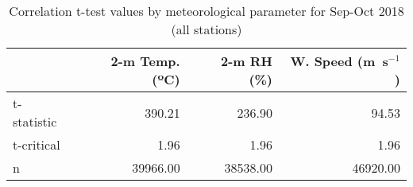 \begin{table}
\centering
\caption{Correlation t-test values by meteorological parameter for Sep-Oct 2018 (all stations)}
\label{tab: r_sign_met_all}
\begin{tabular}{lrrr}
\toprule
{} &     2-m Temp. (ºC) &  2-m RH (\%) &  W. Speed (m~s$^{-1}$) \\
\midrule
t-statistic &    390.21 &     236.90 &     94.53 \\
t-critical  &      1.96 &       1.96 &      1.96 \\
n           &  39966.00 &   38538.00 &  46920.00 \\
\bottomrule
\end{tabular}
\end{table}

